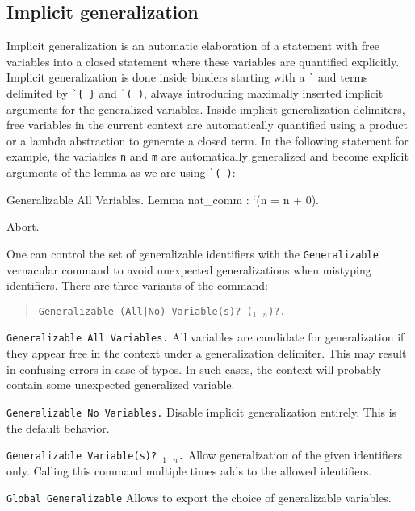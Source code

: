 \subsection{Implicit generalization
\label{implicit-generalization}
}

Implicit generalization is an automatic elaboration of a statement with
free variables into a closed statement where these variables are
quantified explicitly. Implicit generalization is done inside binders
starting with a \texttt{\`{}} and terms delimited by \texttt{\`{}\{ \}} and
\texttt{\`{}( )}, always introducing maximally inserted implicit arguments for
the generalized variables. Inside implicit generalization
delimiters, free variables in the current context are automatically
quantified using a product or a lambda abstraction to generate a closed
term. In the following statement for example, the variables \texttt{n}
and \texttt{m} are automatically generalized and become explicit
arguments of the lemma as we are using \texttt{\`{}( )}:

\begin{coq_example}
Generalizable All Variables.
Lemma nat_comm : `(n = n + 0).
\end{coq_example}
\begin{coq_eval}
Abort.
\end{coq_eval}
One can control the set of generalizable identifiers with the
\texttt{Generalizable} vernacular command to avoid unexpected
generalizations when mistyping identifiers. There are three variants of
the command:

\begin{quote}
{\tt Generalizable (All|No) Variable(s)? ({\ident$_1$ \ident$_n$})?.}
\end{quote}

\begin{Variants}
\item {\tt Generalizable All Variables.} All variables are candidate for 
  generalization if they appear free in the context under a
  generalization delimiter. This may result in confusing errors in
  case of typos. In such cases, the context will probably contain some
  unexpected generalized variable.

\item {\tt Generalizable No Variables.} Disable implicit generalization 
  entirely. This is the default behavior.

\item {\tt Generalizable Variable(s)? {\ident$_1$ \ident$_n$}.} 
  Allow generalization of the given identifiers only. Calling this
  command multiple times adds to the allowed identifiers.

\item {\tt Global Generalizable} Allows to export the choice of
  generalizable variables.
\end{Variants}

